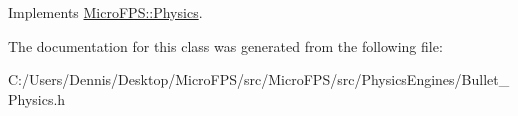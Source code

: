 Implements \hyperlink{class_micro_f_p_s_1_1_physics_a495b990b468be7a75c12f0e33df4f22c}{MicroFPS::Physics}.



The documentation for this class was generated from the following file:\begin{DoxyCompactItemize}
\item 
C:/Users/Dennis/Desktop/MicroFPS/src/MicroFPS/src/PhysicsEngines/Bullet\_\-Physics.h\end{DoxyCompactItemize}

